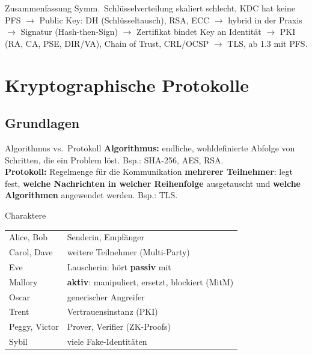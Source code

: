 \documentclass[a4paper, fontsize=7pt]{scrartcl}
\renewcommand*{\arraystretch}{1.5}  %
\begin{document}
\begin{subbox}{Zusammenfassung}
Symm.\ Schlüsselverteilung skaliert schlecht, KDC hat keine PFS $\to$ Public Key:
DH (Schlüsseltausch), RSA, ECC $\to$ hybrid in der Praxis $\to$ Signatur
(Hash-then-Sign) $\to$ Zertifikat bindet Key an Identität $\to$ PKI (RA, CA, PSE,
DIR/VA), Chain of Trust, CRL/OCSP $\to$ TLS, ab 1.3 mit PFS.
\end{subbox}

\section{Kryptographische Protokolle}

\subsection{Grundlagen}

\begin{mainbox}{Algorithmus vs.\ Protokoll}
\textbf{Algorithmus:} endliche, wohldefinierte Abfolge von Schritten, die ein
Problem löst. Bsp.: SHA-256, AES, RSA.\\
\textbf{Protokoll:} Regelmenge für die Kommunikation \textbf{mehrerer Teilnehmer}:
legt fest, \textbf{welche Nachrichten in welcher Reihenfolge} ausgetauscht und
\textbf{welche Algorithmen} angewendet werden. Bsp.: TLS.
\end{mainbox}

\begin{subbox}{Charaktere}
\renewcommand*{\arraystretch}{1.1}
\setlength{\tabcolsep}{3pt}
\begin{tabularx}{\linewidth}{@{}l|>{\raggedright\arraybackslash}X@{}}
Alice, Bob & Senderin, Empfänger \\
Carol, Dave & weitere Teilnehmer (Multi-Party) \\
Eve & Lauscherin: hört \textbf{passiv} mit \\
Mallory & \textbf{aktiv}: manipuliert, ersetzt, blockiert (MitM) \\
Oscar & generischer Angreifer \\
Trent & Vertrauensinstanz (PKI) \\
Peggy, Victor & Prover, Verifier (ZK-Proofs) \\
Sybil & viele Fake-Identitäten \\
\end{tabularx}
\end{subbox}
\end{document}
